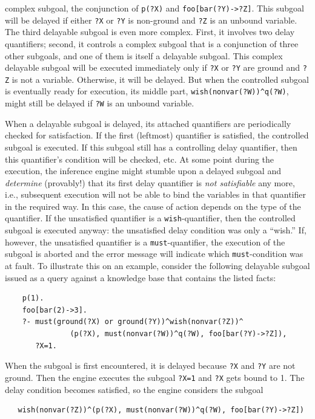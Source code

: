 \documentclass[11pt]{article}
\begin{document}
complex subgoal, the conjunction of \texttt{p(?X)} and
\texttt{foo[bar(?Y)->?Z]}.  This subgoal will be delayed if either
\texttt{?X} or \texttt{?Y} is non-ground and \texttt{?Z} is an unbound
variable. The third delayable subgoal is even more complex. First, it
involves two delay quantifiers; second, it controls a complex subgoal that
is a conjunction of three other subgoals, and one of them is itself a
delayable subgoal.  This complex delayable subgoal will be executed
immediately only if \texttt{?X} or \texttt{?Y} are ground and \texttt{?Z}
is not a variable.  Otherwise, it will be delayed. But when the controlled
subgoal is eventually ready for execution, its middle part,
\texttt{wish(nonvar(?W))\^{}q(?W)}, might still be delayed if \texttt{?W}
is an unbound variable.

When a delayable subgoal is delayed, its attached quantifiers are
periodically checked for satisfaction. If the first (leftmost) quantifier
is satisfied, the controlled subgoal is executed. If this subgoal still has
a controlling delay quantifier, then this quantifier's condition will be
checked, etc.  At some point during the execution, the inference engine
might stumble upon a delayed subgoal and \emph{determine} (provably!)  that
its first delay quantifier is \emph{not satisfiable} any more, i.e.,
subsequent execution will not be able to bind the variables in that
quantifier in the required way.  In this case, the cause of action depends
on the type of the quantifier.  If the unsatisfied quantifier is a
\texttt{wish}-quantifier, then the controlled subgoal is executed anyway:
the unsatisfied delay condition was only a ``wish.'' If, however, the
unsatisfied quantifier is a \texttt{must}-quantifier, the execution of the
subgoal is aborted and the error message will indicate which
\texttt{must}-condition was at fault.  To illustrate this on an example,
consider the following delayable subgoal issued as a query against a
knowledge base that contains the listed facts:
\begin{verbatim}
    p(1).
    foo[bar(2)->3].
    ?- must(ground(?X) or ground(?Y))^wish(nonvar(?Z))^
               (p(?X), must(nonvar(?W))^q(?W), foo[bar(?Y)->?Z]),
       ?X=1.
\end{verbatim}
When the subgoal is first encountered, it is delayed because \texttt{?X}
and \texttt{?Y} are not ground. Then the engine executes the subgoal
\texttt{?X=1} and \texttt{?X} gets bound to 1. The
delay condition becomes satisfied, so the engine considers the subgoal
\begin{verbatim}
   wish(nonvar(?Z))^(p(?X), must(nonvar(?W))^q(?W), foo[bar(?Y)->?Z])
\end{verbatim}
\end{document}
